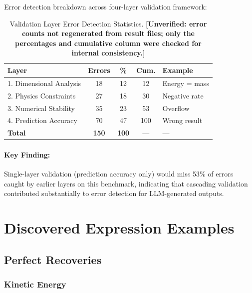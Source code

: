 \documentclass[twoside,11pt]{article}
\begin{document}
Error detection breakdown across four-layer validation framework:

\begin{table}[H]
\centering
\caption{Validation Layer Error Detection Statistics.
  \textbf{[Unverified: error counts not regenerated from result files; only the
  percentages and cumulative column were checked for internal consistency.]}}
\label{tab:validation_stats}
\begin{tabular}{@{}lcccp{3cm}@{}}
\toprule
\textbf{Layer} & \textbf{Errors} & \textbf{\%} & \textbf{Cum.} & \textbf{Example} \\
\midrule
1. Dimensional Analysis & 18 & 12 & 12 & Energy = mass \\
2. Physics Constraints & 27 & 18 & 30 & Negative rate \\
3. Numerical Stability & 35 & 23 & 53 & Overflow \\
4. Prediction Accuracy & 70 & 47 & 100 & Wrong result \\
\midrule
\textbf{Total} & \textbf{150} & \textbf{100} & --- & --- \\
\bottomrule
\end{tabular}
\end{table}

\paragraph{Key Finding:} Single-layer validation (prediction accuracy only) would miss 53\% of errors caught by earlier layers on this benchmark, indicating that cascading validation contributed substantially to error detection for LLM-generated outputs.

\clearpage


\section{Discovered Expression Examples}
\label{app:expressions}

\subsection{Perfect Recoveries}

\subsubsection{Kinetic Energy}
\end{document}
